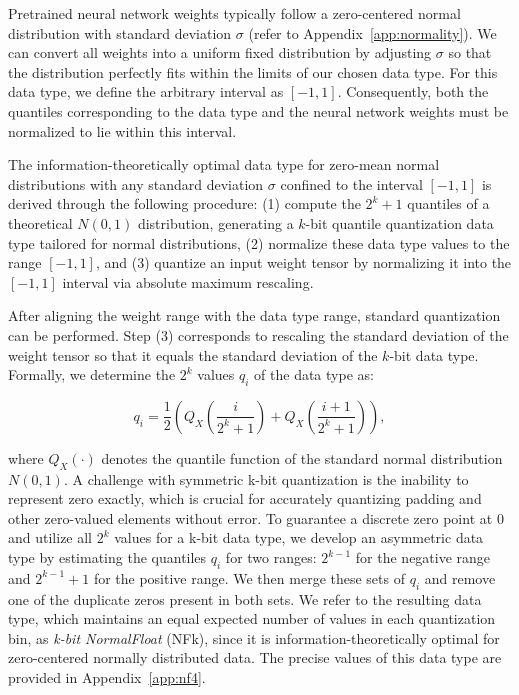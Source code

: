 Pretrained neural network weights typically follow a zero-centered normal distribution with standard deviation $\sigma$ (refer to Appendix~\ref{app:normality}). We can convert all weights into a uniform fixed distribution by adjusting $\sigma$ so that the distribution perfectly fits within the limits of our chosen data type. For this data type, we define the arbitrary interval as $[-1, 1]$. Consequently, both the quantiles corresponding to the data type and the neural network weights must be normalized to lie within this interval.

The information-theoretically optimal data type for zero-mean normal distributions with any standard deviation $\sigma$ confined to the interval $[-1, 1]$ is derived through the following procedure: (1) compute the $2^k+1$ quantiles of a theoretical $N(0, 1)$ distribution, generating a $k$-bit quantile quantization data type tailored for normal distributions, (2) normalize these data type values to the range $[-1, 1]$, and (3) quantize an input weight tensor by normalizing it into the $[-1, 1]$ interval via absolute maximum rescaling.

After aligning the weight range with the data type range, standard quantization can be performed. Step (3) corresponds to rescaling the standard deviation of the weight tensor so that it equals the standard deviation of the $k$-bit data type. Formally, we determine the $2^k$ values $q_i$ of the data type as:

\begin{equation}
q_i  = \frac{1}{2}\left( Q_X\left(\frac{i}{2^k+1}\right) + Q_X\left(\frac{i+1}{2^k+1}\right)\right),
\end{equation}

where $Q_X(\cdot)$ denotes the quantile function of the standard normal distribution $N(0,1)$. A challenge with symmetric k-bit quantization is the inability to represent zero exactly, which is crucial for accurately quantizing padding and other zero-valued elements without error. To guarantee a discrete zero point at $0$ and utilize all $2^k$ values for a k-bit data type, we develop an asymmetric data type by estimating the quantiles $q_i$ for two ranges: $2^{k-1}$ for the negative range and $2^{k-1}+1$ for the positive range. We then merge these sets of $q_i$ and remove one of the duplicate zeros present in both sets. We refer to the resulting data type, which maintains an equal expected number of values in each quantization bin, as \emph{k-bit NormalFloat} (NFk), since it is information-theoretically optimal for zero-centered normally distributed data. The precise values of this data type are provided in Appendix~\ref{app:nf4}.

